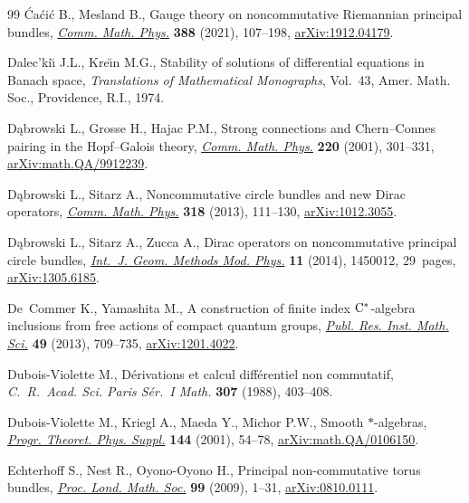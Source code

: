 \documentclass[10pt,a4paper]{amsart}
\numberwithin{equation}{section}
\begin{document}
\begin{thebibliography}{99}
\'Ca\'ci\'c B., Mesland B., Gauge theory on noncommutative {R}iemannian
 principal bundles, \href{https://doi.org/10.1007/s00220-021-04187-8}{\textit{Comm. Math. Phys.}} \textbf{388} (2021), 107--198,
 \href{https://arxiv.org/abs/1912.04179}{arXiv:1912.04179}.

Dalec'ki\u{\i} J.L., Kre\u{\i}n M.G., Stability of solutions of differential
 equations in {B}anach space, \textit{Translations of Mathematical
 Monographs}, Vol.~43, Amer. Math. Soc., Providence, R.I., 1974.

D\k{a}browski L., Grosse H., Hajac P.M., Strong connections and
 {C}hern--{C}onnes pairing in the {H}opf--{G}alois theory, \href{https://doi.org/10.1007/s002200100433}{\textit{Comm. Math.
 Phys.}} \textbf{220} (2001), 301--331, \href{https://arxiv.org/abs/math.QA/9912239}{arXiv:math.QA/9912239}.

D\k{a}browski L., Sitarz A., Noncommutative circle bundles and new {D}irac
 operators, \href{https://doi.org/10.1007/s00220-012-1550-8}{\textit{Comm. Math. Phys.}} \textbf{318} (2013), 111--130,
 \href{https://arxiv.org/abs/1012.3055}{arXiv:1012.3055}.

D\k{a}browski L., Sitarz A., Zucca A., Dirac operators on noncommutative
 principal circle bundles, \href{https://doi.org/10.1142/S0219887814500121}{\textit{Int.~J. Geom. Methods Mod. Phys.}}
 \textbf{11} (2014), 1450012, 29~pages, \href{https://arxiv.org/abs/1305.6185}{arXiv:1305.6185}.

De~Commer K., Yamashita M., A construction of finite index {${\rm
 C}^*$}-algebra inclusions from free actions of compact quantum groups,
 \href{https://doi.org/10.4171/PRIMS/117}{\textit{Publ. Res. Inst. Math. Sci.}} \textbf{49} (2013), 709--735,
 \href{https://arxiv.org/abs/1201.4022}{arXiv:1201.4022}.

Dubois-Violette M., D\'erivations et calcul diff\'erentiel non commutatif,
 \textit{C.~R.~Acad. Sci. Paris S\'er.~I Math.} \textbf{307} (1988), 403--408.

Dubois-Violette M., Kriegl A., Maeda Y., Michor P.W., Smooth {$*$}-algebras,
 \href{https://doi.org/10.1143/PTPS.144.54}{\textit{Progr. Theoret. Phys. Suppl.}} \textbf{144} (2001), 54--78,
 \href{https://arxiv.org/abs/math.QA/0106150}{arXiv:math.QA/0106150}.

Echterhoff S., Nest R., Oyono-Oyono H., Principal non-commutative torus
 bundles, \href{https://doi.org/10.1112/plms/pdn050}{\textit{Proc. Lond. Math. Soc.}} \textbf{99} (2009), 1--31,
 \href{https://arxiv.org/abs/0810.0111}{arXiv:0810.0111}.


\end{thebibliography}
\end{document}
